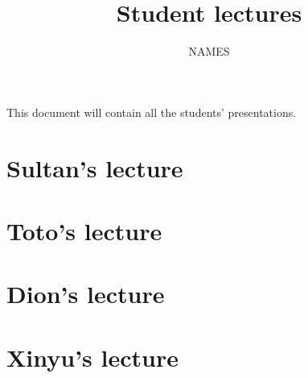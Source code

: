 \documentclass[11pt,reqno,oneside,a4paper]{article}
\title{Student lectures}
\author{NAMES}
\begin{document}

\maketitle
\thispagestyle{fancy}

This document will contain all the students' presentations.

\tableofcontents

\clearpage
\section{Sultan's lecture} \label{sec:Sultan}


\clearpage
\section{Toto's lecture} \label{sec:Toto}


\clearpage
\section{Dion's lecture} \label{sec:Dion}


\clearpage
\section{Xinyu's lecture} \label{sec:Xinyu}

\end{document}

